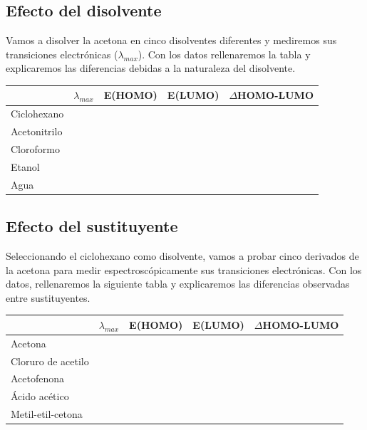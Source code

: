 \documentclass{tufte-book}
\begin{document}
\subsection{Efecto del disolvente}
Vamos a disolver la acetona en cinco disolventes diferentes
y mediremos sus transiciones electrónicas ($\lambda_{max}$).
Con los datos rellenaremos la tabla y explicaremos las
diferencias debidas a la naturaleza del disolvente.

\begin{table}[h!]
\centering
    \begin{tabular}{|l|c|c|c|c|}
    \hline
     & $\lambda_{max}$ & E(HOMO) & E(LUMO) &  $\Delta$HOMO-LUMO    \\
     \hline
    Ciclohexano &  & & &\\
    Acetonitrilo &  & & &\\
    Cloroformo  & &  & &\\
    Etanol  & & & &\\
    Agua  & & & &\\
\hline
\end{tabular}
\end{table}

\subsection{Efecto del sustituyente}
Seleccionando el ciclohexano como disolvente, vamos a probar
cinco derivados de la acetona para medir espectroscópicamente
sus transiciones electrónicas. Con los datos, rellenaremos la
siguiente tabla y explicaremos las diferencias observadas 
entre sustituyentes.

\begin{table}[h!]
\centering
    \begin{tabular}{|l|c|c|c|c|}
    \hline
     & $\lambda_{max}$ & E(HOMO) & E(LUMO) &  $\Delta$HOMO-LUMO    \\
     \hline
    Acetona &  & & &\\
    Cloruro de acetilo &  & & &\\
    Acetofenona  & &  & &\\
    Ácido acético  & & & &\\
    Metil-etil-cetona  & & & &\\
\hline
\end{tabular}
\end{table}


%
%
\end{document}
